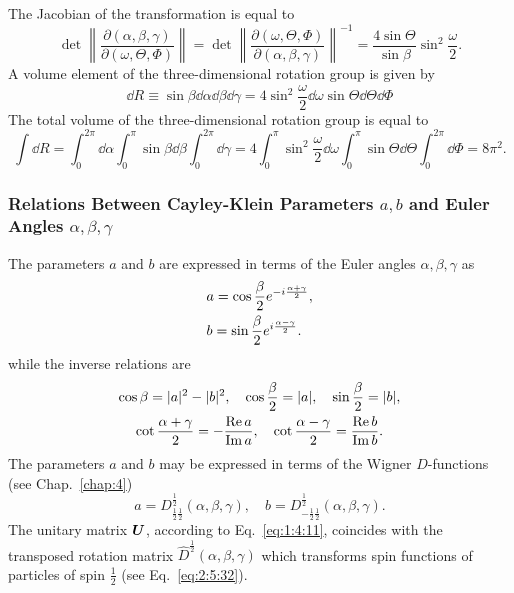 The Jacobian of the transformation is equal to
\begin{equation}
\det \left\|\frac{\partial(\alpha, \beta, \gamma)}{\partial(\omega, \Theta, \Phi)}\right\|=\det \left\|\frac{\partial(\omega, \Theta, \Phi)}{\partial(\alpha, \beta, \gamma)}\right\|^{-1}=\frac{4 \sin \Theta}{\sin \beta} \sin ^{2} \frac{\omega}{2} .\label{eq:1:4:20}
\end{equation}
A volume element of the three-dimensional rotation group is given by
\begin{equation}
\dd R \equiv \sin \beta \dd \alpha \dd \beta \dd \gamma=4 \sin ^{2} \frac{\omega}{2} \dd \omega \sin \Theta \dd \Theta \dd \Phi \label{eq:1:4:21}
\end{equation}
The total volume of the three-dimensional rotation group is equal to
\begin{equation}
\int \dd R=\int_{0}^{2 \pi} \dd \alpha \int_{0}^{\pi} \sin \beta \dd \beta \int_{0}^{2 \pi} \dd \gamma=4 \int_{0}^{\pi} \sin ^{2} \frac{\omega}{2} \dd \omega \int_{0}^{\pi} \sin \Theta \dd \Theta \int_{0}^{2 \pi} \dd \Phi=8 \pi^{2}. \label{eq:1:4:22}
\end{equation}
\subsubsection{Relations Between Cayley-Klein Parameters \(a, b\) and Euler Angles \(\alpha, \beta, \gamma\)}

The parameters \(a\) and \(b\) are expressed in terms of the Euler angles \(\alpha, \beta, \gamma\) as
\begin{align}
& a=\cos \frac{\beta}{2} e^{-i \frac{\alpha+\gamma}{2}} , \notag\\
& b=\sin \frac{\beta}{2} e^{i \frac{\alpha-\gamma}{2}} .\label{eq:1:4:23}
\end{align}
while the inverse relations are
\begin{gather}
\cos \beta=|a|^{2}-|b|^{2}, \quad \cos \frac{\beta}{2}=|a|, \quad \sin \frac{\beta}{2}=|b|,  \label{eq:1:4:24}\\
\cot \frac{\alpha+\gamma}{2}=-\frac{\Re  a}{\Im  a}, \quad \cot \frac{\alpha-\gamma}{2}=\frac{\Re  b}{\Im  b}. \notag
\end{gather}
The parameters \(a\) and \(b\) may be expressed in terms of the Wigner \(D\)-functions (see Chap.~\ref{chap:4})
\begin{equation}
a=D_{\frac{1}{2} \frac{1}{2}}^{\frac{1}{2}}(\alpha, \beta, \gamma), \quad b=D_{-\frac{1}{2} \frac{1}{2}}^{\frac{1}{2}}(\alpha, \beta, \gamma) . \label{eq:1:4:25}
\end{equation}
The unitary matrix \(\mat U\), according to Eq.~\eqref{eq:1:4:11}, coincides with the transposed rotation matrix \(\widehat{D}^{\frac{1}{2}}(\alpha, \beta, \gamma)\) which transforms spin functions of particles of spin \(\frac{1}{2}\) (see Eq.~\eqref{eq:2:5:32}).\\

